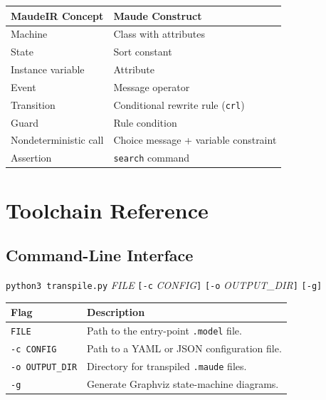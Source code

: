 \documentclass[11pt,letterpaper]{article}
\begin{document}
\begin{center}
\begin{tabular}{@{}ll@{}}
\toprule
\textbf{MaudeIR Concept} & \textbf{Maude Construct} \\
\midrule
Machine              & Class with attributes \\
State                & Sort constant \\
Instance variable    & Attribute \\
Event                & Message operator \\
Transition           & Conditional rewrite rule (\texttt{crl}) \\
Guard                & Rule condition \\
Nondeterministic call & Choice message + variable constraint \\
Assertion            & \texttt{search} command \\
\bottomrule
\end{tabular}
\end{center}


\section{Toolchain Reference}
\label{sec:toolchain}

\subsection{Command-Line Interface}

\begin{syntaxbox}[transpile.py]
\texttt{python3 transpile.py} \textit{FILE}
  \texttt{[-c} \textit{CONFIG}\texttt{]}
  \texttt{[-o} \textit{OUTPUT\_DIR}\texttt{]}
  \texttt{[-g]}
\end{syntaxbox}

\begin{longtable}{@{}p{3.5cm}p{9cm}@{}}
\toprule
\textbf{Flag} & \textbf{Description} \\
\midrule
\texttt{FILE}          & Path to the entry-point \texttt{.model} file. \\
\texttt{-c CONFIG}     & Path to a YAML or JSON configuration file. \\
\texttt{-o OUTPUT\_DIR} & Directory for transpiled \texttt{.maude} files. \\
\texttt{-g}            & Generate Graphviz state-machine diagrams. \\
\bottomrule
\end{longtable}
\end{document}
